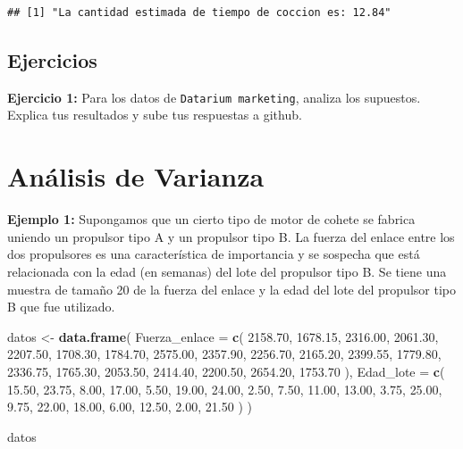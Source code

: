 \documentclass[
]{book}
\newenvironment{Shaded}{\begin{snugshade}}{\end{snugshade}}
\newcommand{\AttributeTok}[1]{\textcolor[rgb]{0.13,0.29,0.53}{#1}}
\newcommand{\FloatTok}[1]{\textcolor[rgb]{0.00,0.00,0.81}{#1}}
\newcommand{\FunctionTok}[1]{\textcolor[rgb]{0.13,0.29,0.53}{\textbf{#1}}}
\newcommand{\NormalTok}[1]{#1}
\newcommand{\OtherTok}[1]{\textcolor[rgb]{0.56,0.35,0.01}{#1}}
\begin{document}
\begin{verbatim}
## [1] "La cantidad estimada de tiempo de coccion es: 12.84"
\end{verbatim}

\subsection{Ejercicios}\label{ejercicios-2}

\textbf{Ejercicio 1:} Para los datos de \texttt{Datarium\ marketing}, analiza los supuestos. Explica tus resultados y sube tus respuestas a github.

\section{Análisis de Varianza}\label{anuxe1lisis-de-varianza}

\textbf{Ejemplo 1: } Supongamos que un cierto tipo de motor de cohete se fabrica uniendo un propulsor tipo A y un propulsor tipo B. La fuerza del enlace entre los dos propulsores es una característica de importancia y se sospecha que está relacionada con la edad (en semanas) del lote del propulsor tipo B. Se tiene una muestra de tamaño 20 de la fuerza del enlace y la edad del lote del propulsor tipo B que fue utilizado.

\begin{Shaded}
\begin{Highlighting}[]
\NormalTok{datos }\OtherTok{\textless{}{-}} \FunctionTok{data.frame}\NormalTok{(}
  \AttributeTok{Fuerza\_enlace =} \FunctionTok{c}\NormalTok{(}
    \FloatTok{2158.70}\NormalTok{, }\FloatTok{1678.15}\NormalTok{, }\FloatTok{2316.00}\NormalTok{, }\FloatTok{2061.30}\NormalTok{, }\FloatTok{2207.50}\NormalTok{,}
    \FloatTok{1708.30}\NormalTok{, }\FloatTok{1784.70}\NormalTok{, }\FloatTok{2575.00}\NormalTok{, }\FloatTok{2357.90}\NormalTok{, }\FloatTok{2256.70}\NormalTok{,}
    \FloatTok{2165.20}\NormalTok{, }\FloatTok{2399.55}\NormalTok{, }\FloatTok{1779.80}\NormalTok{, }\FloatTok{2336.75}\NormalTok{, }\FloatTok{1765.30}\NormalTok{,}
    \FloatTok{2053.50}\NormalTok{, }\FloatTok{2414.40}\NormalTok{, }\FloatTok{2200.50}\NormalTok{, }\FloatTok{2654.20}\NormalTok{, }\FloatTok{1753.70}
\NormalTok{  ),}
  \AttributeTok{Edad\_lote =} \FunctionTok{c}\NormalTok{(}
    \FloatTok{15.50}\NormalTok{, }\FloatTok{23.75}\NormalTok{, }\FloatTok{8.00}\NormalTok{, }\FloatTok{17.00}\NormalTok{, }\FloatTok{5.50}\NormalTok{,}
    \FloatTok{19.00}\NormalTok{, }\FloatTok{24.00}\NormalTok{, }\FloatTok{2.50}\NormalTok{, }\FloatTok{7.50}\NormalTok{, }\FloatTok{11.00}\NormalTok{,}
    \FloatTok{13.00}\NormalTok{, }\FloatTok{3.75}\NormalTok{, }\FloatTok{25.00}\NormalTok{, }\FloatTok{9.75}\NormalTok{, }\FloatTok{22.00}\NormalTok{,}
    \FloatTok{18.00}\NormalTok{, }\FloatTok{6.00}\NormalTok{, }\FloatTok{12.50}\NormalTok{, }\FloatTok{2.00}\NormalTok{, }\FloatTok{21.50}
\NormalTok{  )}
\NormalTok{)}

\NormalTok{datos}
\end{Highlighting}
\end{Shaded}
\end{document}
